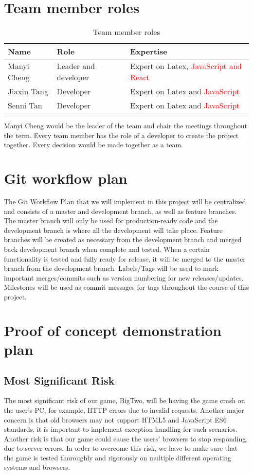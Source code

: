 \documentclass{article}
\begin{document}
\section{Team member roles}
\begin{table}[H]
    \begin{center}
    \begin{tabularx}{\textwidth}{|X|X|X|}
        \hline
         Name & Role & Expertise\\
        \hline
        Manyi Cheng & Leader and developer & Expert on Latex, \textcolor{red}{JavaScript and React}\\
        \hline
        Jiaxin Tang & Developer & Expert on Latex and \textcolor{red}{JavaScript}\\
        \hline
        Senni Tan & Developer & Expert on Latex and \textcolor{red}{JavaScript}\\
        \hline
    \end{tabularx}
    \caption{Team member roles}
    \label{tab:roles}
    \end{center}
\end{table}
\FloatBarrier
Manyi Cheng would be the leader of the team and chair the meetings throughout the term. Every team member has the role of a developer to create the project together. Every decision would be made together as a team.

\section{Git workflow plan}
The Git Workflow Plan that we will implement in this project will be centralized and consists of a master and development branch, as well as feature branches.
The master branch will only be used for production-ready code and the development branch is where all the development will take place. Feature branches will be created as necessary from the development branch and merged back development branch when complete and tested. When a certain functionality is tested and fully ready for release, it will be merged to the master branch from the development branch. Labels/Tags will be used to mark important merges/commits such as version numbering for new releases/updates. Milestones will be used as commit messages for tags throughout the course of this project.
\section{Proof of concept demonstration plan}
\subsection{Most Significant Risk}
The most significant risk of our game, BigTwo, will be having the game crash on the user's PC, for example, HTTP errors due to invalid requests. Another major concern is that old browsers may not support HTML5 and JavaScript ES6 standards, it is important to implement exception handling for such scenarios. Another risk is that our game could cause the users' browsers to stop responding, due to server errors. In order to overcome this risk, we have to make sure that the game is tested thoroughly and rigorously on multiple different operating systems and browsers.
\end{document}

